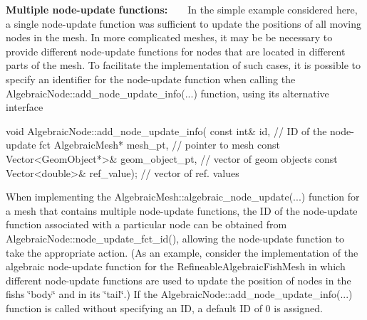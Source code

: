 \begin{DoxyItemize}
\item {\bfseries Multiple node-\/update functions\+:} ~\newline
 ~\newline
 In the simple example considered here, a single node-\/update function was sufficient to update the positions of all moving nodes in the mesh. In more complicated meshes, it may be be necessary to provide different node-\/update functions for nodes that are located in different parts of the mesh. To facilitate the implementation of such cases, it is possible to specify an identifier for the node-\/update function when calling the {\ttfamily Algebraic\+Node\+::add\+\_\+node\+\_\+update\+\_\+info}(...) function, using its alternative interface 
\begin{DoxyCode}
\textcolor{keywordtype}{void} AlgebraicNode::add\_node\_update\_info(
    \textcolor{keyword}{const} \textcolor{keywordtype}{int}& \textcolor{keywordtype}{id},                              \textcolor{comment}{// ID of the node-update fct}
    AlgebraicMesh* mesh\_pt,                     \textcolor{comment}{// pointer to mesh}
    \textcolor{keyword}{const} Vector<GeomObject*>& geom\_object\_pt,  \textcolor{comment}{// vector of geom objects}
    \textcolor{keyword}{const} Vector<double>& ref\_value);           \textcolor{comment}{// vector of ref. values}
\end{DoxyCode}
 When implementing the {\ttfamily Algebraic\+Mesh\+::algebraic\+\_\+node\+\_\+update}(...) function for a mesh that contains multiple node-\/update functions, the ID of the node-\/update function associated with a particular node can be obtained from {\ttfamily Algebraic\+Node\+::node\+\_\+update\+\_\+fct\+\_\+id()}, allowing the node-\/update function to take the appropriate action. (As an example, consider the implementation of the algebraic node-\/update function for the {\ttfamily Refineable\+Algebraic\+Fish\+Mesh} in which different node-\/update functions are used to update the position of nodes in the fish\textquotesingle{}s \char`\"{}body\char`\"{} and in its \char`\"{}tail\char`\"{}.) If the {\ttfamily Algebraic\+Node\+::add\+\_\+node\+\_\+update\+\_\+info}(...) function is called without specifying an ID, a default ID of 0 is assigned. ~\newline
~\newline


\end{DoxyItemize}

